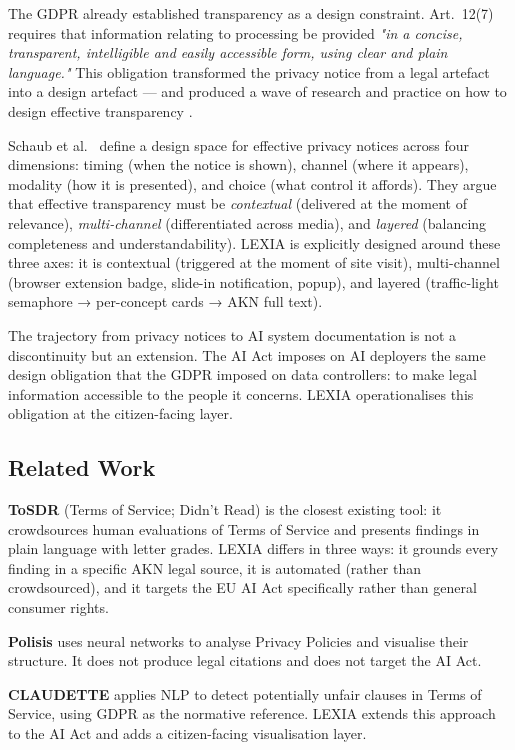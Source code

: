 \documentclass[12pt, a4paper]{article}
\begin{document}
The GDPR already established transparency as a design constraint. Art.\ 12(7) requires that information relating to processing be provided \emph{"in a concise, transparent, intelligible and easily accessible form, using clear and plain language."} This obligation transformed the privacy notice from a legal artefact into a design artefact --- and produced a wave of research and practice on how to design effective transparency \cite{schaub2015, edpb2019}.

Schaub et al.\ \cite{schaub2015} define a design space for effective privacy notices across four dimensions: timing (when the notice is shown), channel (where it appears), modality (how it is presented), and choice (what control it affords). They argue that effective transparency must be \emph{contextual} (delivered at the moment of relevance), \emph{multi-channel} (differentiated across media), and \emph{layered} (balancing completeness and understandability). LEXIA is explicitly designed around these three axes: it is contextual (triggered at the moment of site visit), multi-channel (browser extension badge, slide-in notification, popup), and layered (traffic-light semaphore → per-concept cards → AKN full text).

The trajectory from privacy notices to AI system documentation is not a discontinuity but an extension. The AI Act imposes on AI deployers the same design obligation that the GDPR imposed on data controllers: to make legal information accessible to the people it concerns. LEXIA operationalises this obligation at the citizen-facing layer.

\subsection{Related Work}

\textbf{ToSDR} (Terms of Service; Didn't Read) \cite{tosdr} is the closest existing tool: it crowdsources human evaluations of Terms of Service and presents findings in plain language with letter grades. LEXIA differs in three ways: it grounds every finding in a specific AKN legal source, it is automated (rather than crowdsourced), and it targets the EU AI Act specifically rather than general consumer rights.

\textbf{Polisis} \cite{harkous2018} uses neural networks to analyse Privacy Policies and visualise their structure. It does not produce legal citations and does not target the AI Act.

\textbf{CLAUDETTE} \cite{lippi2019} applies NLP to detect potentially unfair clauses in Terms of Service, using GDPR as the normative reference. LEXIA extends this approach to the AI Act and adds a citizen-facing visualisation layer.
\end{document}
